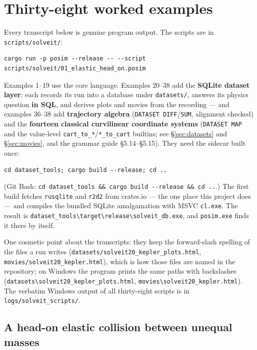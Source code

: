 \documentclass[11pt]{article}
\newcommand{\kw}[1]{\texttt{\uppercase{#1}}}
\newcommand{\code}[1]{\texttt{#1}}
\begin{document}
\section{Thirty-eight worked examples}\label{sec:examples}

Every transcript below is genuine program output. The scripts are in
\code{scripts/solveit/}:

\begin{lstlisting}
cargo run -p posim --release -- --script scripts/solveit/01_elastic_head_on.posim
\end{lstlisting}

Examples 1--19 use the core language. Examples 20--38 add the
\textbf{SQLite dataset layer}: each records its run into a database
under \code{datasets/}, answers its physics question \textbf{in SQL},
and derives plots and movies from the recording --- and examples
36--38 add \textbf{trajectory algebra} (\kw{dataset diff}/\kw{sum},
alignment checked) and the \textbf{fourteen classical curvilinear
coordinate systems} (\kw{dataset map} and the value-level
\code{cart\_to\_*}/\code{*\_to\_cart} builtins; see
\S\ref{sec:datasets} and \S\ref{sec:movies}, and the grammar guide
\S5.14--\S5.15). They need the sidecar built once:

\begin{lstlisting}
cd dataset_tools; cargo build --release; cd ..
\end{lstlisting}

(Git Bash: \code{cd dataset\_tools \&\& cargo build -{}-release \&\& cd ..}.)
The first build fetches \code{rusqlite} and \code{r2d2} from crates.io
--- the one place this project does --- and compiles the bundled SQLite
amalgamation with MSVC \code{cl.exe}. The result is
\code{dataset\_tools\textbackslash{}target\textbackslash{}release\textbackslash{}solveit\_db.exe},
and \code{posim.exe} finds it there by itself.

One cosmetic point about the transcripts: they keep the forward-slash
spelling of the files a run writes
(\code{datasets/solveit20\_kepler\_plots.html},
\code{movies/solveit20\_kepler.html}), which is how those files are
named in the repository; on Windows the program prints the same paths
with backslashes
(\code{datasets\textbackslash{}solveit20\_kepler\_plots.html},
\code{movies\textbackslash{}solveit20\_kepler.html}). The verbatim
Windows output of all thirty-eight scripts is in
\code{logs/solveit\_scripts/}.

\subsection{A head-on elastic collision between unequal masses}
\end{document}
